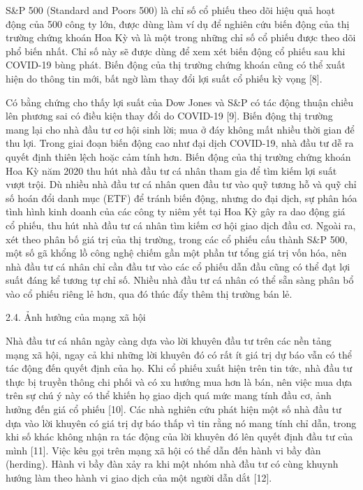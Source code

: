 S\&P 500 (Standard and Poor\textquotesingle s 500) là chỉ số cổ phiếu theo dõi hiệu quả hoạt động của 500 công ty lớn, được dùng làm ví dụ để nghiên cứu biến động của thị trường chứng khoán Hoa Kỳ và là một trong những chỉ số cổ phiếu được theo dõi phổ biến nhất. Chỉ số này sẽ được dùng để xem xét biến động cổ phiếu sau khi COVID-19 bùng phát. Biến động của thị trường chứng khoán cũng có thể xuất hiện do thông tin mới, bất ngờ làm thay đổi lợi suất cổ phiếu kỳ vọng {[}8{]}.

Có bằng chứng cho thấy lợi suất của Dow Jones và S\&P có tác động thuận chiều lên phương sai có điều kiện thay đổi do COVID-19 {[}9{]}. Biến động thị trường mang lại cho nhà đầu tư cơ hội sinh lời; mua ở đáy không mất nhiều thời gian để thu lợi. Trong giai đoạn biến động cao như đại dịch COVID-19, nhà đầu tư dễ ra quyết định thiên lệch hoặc cảm tính hơn. Biến động của thị trường chứng khoán Hoa Kỳ năm 2020 thu hút nhà đầu tư cá nhân tham gia để tìm kiếm lợi suất vượt trội. Dù nhiều nhà đầu tư cá nhân quen đầu tư vào quỹ tương hỗ và quỹ chỉ số hoán đổi danh mục (ETF) để tránh biến động, nhưng do đại dịch, sự phân hóa tình hình kinh doanh của các công ty niêm yết tại Hoa Kỳ gây ra dao động giá cổ phiếu, thu hút nhà đầu tư cá nhân tìm kiếm cơ hội giao dịch đầu cơ. Ngoài ra, xét theo phân bố giá trị của thị trường, trong các cổ phiếu cấu thành S\&P 500, một số gã khổng lồ công nghệ chiếm gần một phần tư tổng giá trị vốn hóa, nên nhà đầu tư cá nhân chỉ cần đầu tư vào các cổ phiếu dẫn đầu cũng có thể đạt lợi suất đáng kể tương tự chỉ số. Nhiều nhà đầu tư cá nhân có thể sẵn sàng phân bổ vào cổ phiếu riêng lẻ hơn, qua đó thúc đẩy thêm thị trường bán lẻ.

2.4. Ảnh hưởng của mạng xã hội

Nhà đầu tư cá nhân ngày càng dựa vào lời khuyên đầu tư trên các nền tảng mạng xã hội, ngay cả khi những lời khuyên đó có rất ít giá trị dự báo vẫn có thể tác động đến quyết định của họ. Khi cổ phiếu xuất hiện trên tin tức, nhà đầu tư thực bị truyền thông chi phối và có xu hướng mua hơn là bán, nên việc mua dựa trên sự chú ý này có thể khiến họ giao dịch quá mức mang tính đầu cơ, ảnh hưởng đến giá cổ phiếu {[}10{]}. Các nhà nghiên cứu phát hiện một số nhà đầu tư dựa vào lời khuyên có giá trị dự báo thấp vì tin rằng nó mang tính chỉ dẫn, trong khi số khác không nhận ra tác động của lời khuyên đó lên quyết định đầu tư của mình {[}11{]}. Việc kêu gọi trên mạng xã hội có thể dẫn đến hành vi bầy đàn (herding). Hành vi bầy đàn xảy ra khi một nhóm nhà đầu tư có cùng khuynh hướng làm theo hành vi giao dịch của một người dẫn dắt {[}12{]}.

